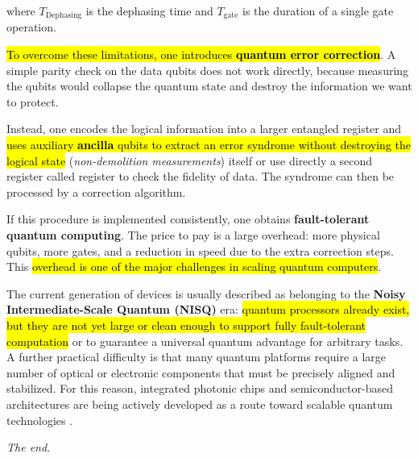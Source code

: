 where $T_{\text{Dephasing}}$ is the dephasing time and $T_{\text{gate}}$ is the duration of a single gate operation.

\hl{To overcome these limitations, one introduces \textbf{quantum error correction}}. A simple parity check on the data qubits does not work directly, because measuring the qubits would collapse the quantum state and destroy the information we want to protect. 

Instead, one encodes the logical information into a larger entangled register and \hl{uses auxiliary \textbf{ancilla} qubits to extract an error syndrome without destroying the logical state} (\emph{non-demolition measurements}) itself or use directly a second register called  register to check the fidelity of data. The syndrome can then be processed by a correction algorithm.

If this procedure is implemented consistently, one obtains \textbf{fault-tolerant quantum computing}. The price to pay is a large overhead: more physical qubits, more gates, and a reduction in speed due to the extra correction steps. This \hl{overhead is one of the major challenges in scaling quantum computers}.

The current generation of devices is usually described as belonging to the \textbf{Noisy Intermediate-Scale Quantum (NISQ)} era: \hl{quantum processors already exist, but they are not yet large or clean enough to support fully fault-tolerant computation} or to guarantee a universal quantum advantage for arbitrary tasks. A further practical difficulty is that many quantum platforms require a large number of optical or electronic components that must be precisely aligned and stabilized. For this reason, integrated photonic chips and semiconductor-based architectures are being actively developed as a route toward scalable quantum technologies \cite{art:Arute-2019-quantum-supremacy,art:Acharya-2024-error-correction}.

\vspace{2ex}

\emph{The end.}